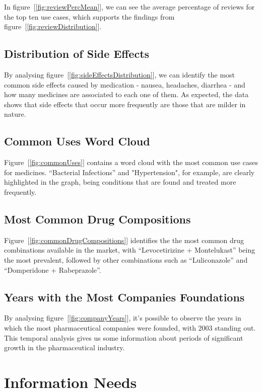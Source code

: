 \documentclass[sigconf]{acmart}
\begin{document}
In figure~[\ref{fig:reviewPercMean}], we can see the average percentage of reviews for the top ten use cases, which supports the findings from figure~[\ref{fig:reviewDistribution}].

\subsection{Distribution of Side Effects}

By analysing figure~[\ref{fig:sideEffectsDistribution}], we can identify the most common side effects caused by medication - nausea, headaches, diarrhea - and how many medicines are associated to each one of them. As expected, the data shows that side effects that occur more frequently are those that are milder in nature.

\subsection{Common Uses Word Cloud}

Figure~[\ref{fig:commonUses}] contains a word cloud with the most common use cases for medicines. “Bacterial Infections” and "Hypertension", for example, are clearly highlighted in the graph, being conditions that are found and treated more frequently.

\subsection{Most Common Drug Compositions}

Figure~[\ref{fig:commonDrugCompositions}] identifies the the most common drug combinations available in the market, with “Levocetirizine + Montelukast” being the most prevalent, followed by other combinations such as “Luliconazole” and “Domperidone + Rabeprazole”.

\subsection{Years with the Most Companies Foundations}	

By analysing figure~[\ref{fig:companyYears}], it's possible to observe the years in which the most pharmaceutical companies were founded, with 2003 standing out. This temporal analysis gives us some information about periods of significant growth in the pharmaceutical industry.

\section{Information Needs}
\end{document}
